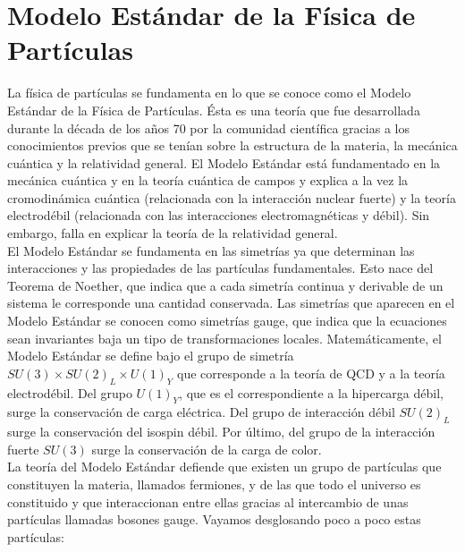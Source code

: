 
\section{Modelo Estándar de la Física de Partículas}

La física de partículas se fundamenta en lo que se conoce como el Modelo Estándar de la Física de Partículas. Ésta es una teoría que fue desarrollada durante la década de los años 70 por la comunidad científica gracias a los conocimientos previos que se tenían sobre la estructura de la materia, la mecánica cuántica y la relatividad general. El Modelo Estándar está fundamentado en la mecánica cuántica y en la teoría cuántica de campos y explica a la vez la cromodinámica cuántica (relacionada con la interacción nuclear fuerte) y la teoría electrodébil (relacionada con las interacciones electromagnéticas y débil). Sin embargo, falla en explicar la teoría de la relatividad general. \\

El Modelo Estándar se fundamenta en las simetrías ya que determinan las interacciones y las propiedades de las partículas fundamentales. Esto nace del Teorema de Noether, que indica que a cada simetría continua y derivable de un sistema le corresponde una cantidad conservada. \cite{noether_th} Las simetrías que aparecen en el Modelo Estándar se conocen como simetrías gauge, que indica que la ecuaciones sean invariantes baja un tipo de transformaciones locales. Matemáticamente, el Modelo Estándar se define bajo el grupo de simetría $SU(3) \times SU(2)_L \times U(1)_Y$ que corresponde a la teoría de QCD y a la teoría electrodébil. Del grupo $U(1)_Y$, que es el correspondiente a la hipercarga débil, surge la conservación de carga eléctrica. Del grupo de interacción débil $SU(2)_L$ surge la conservación del isospin débil. Por último, del grupo de la interacción fuerte $SU(3)$ surge la conservación de la carga de color.\\

La teoría del Modelo Estándar defiende que existen un grupo de partículas que constituyen la materia, llamados fermiones, y de las que todo el universo es constituido y que interaccionan entre ellas gracias al intercambio de unas partículas llamadas bosones gauge. Vayamos desglosando poco a poco estas partículas:\\

